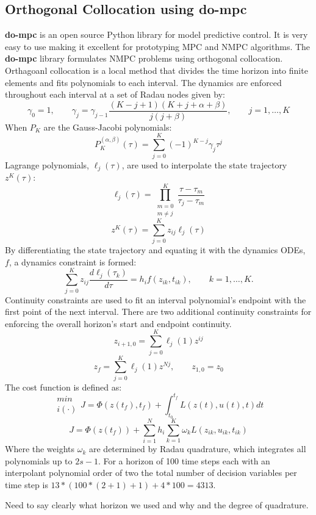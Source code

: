 \documentclass[]{article}
\begin{document}
\subsection*{Orthogonal Collocation using {do-mpc}} 
{\bf do-mpc} \citep{do-mpc}  is an open source Python library for model predictive control. It is very easy to use making it excellent for prototyping  MPC and NMPC algorithms.  
The {\bf do-mpc} library formulates NMPC problems using orthogonal collocation. Orthagoanl collocation is a local method that divides the time horizon into finite elements and fits polynomials to each interval. The dynamics are enforced throughout each interval at a set of Radau nodes given by:
        \[
        \gamma_0=1,  \qquad \gamma_j = \gamma_{j-1} \frac{(K-j+1)(K+j+\alpha+\beta)}{j(j+\beta)}, \qquad j = 1,\ldots,K
        \]
When $P_K$ are the Gauss-Jacobi polynomials:
        \[
        P_K^{(\alpha, \beta)}(\tau) = \sum_{j=0}^{K}(-1)^{K-j}\gamma_j\tau^j
        \]
Lagrange polynomials, $\ell_j(\tau)$, are used to interpolate the state trajectory $z^K(\tau)$:
        \[
	\ell_j(\tau)=\prod_{\substack{m=0 \\ m\neq j}}^{K}\frac{\tau-\tau_m}{\tau_j-\tau_m}
        \]        
        \[
	z^K(\tau)=\sum_{j=0}^{K}z_{ij}\ell_j(\tau)
        \]
By differentiating the state trajectory and equating it with the dynamics ODEs, $f$, a dynamics constraint is formed:
        \[
        \sum_{j=0}^K z_{ij}\frac{d\ell_j(\tau_k)}{d\tau}=h_if(z_{ik},t_{ik}), 
        \qquad k=1,\dots,K.
        \]
Continuity constraints are used to fit an interval polynomial's endpoint with the first point of the next interval. There are two additional continuity constraints for enforcing the overall horizon's start and endpoint continuity.
        \[
	z_{i+1,0}=\sum_{j=0}^{K}\ell_j(1)z^{ij}
        \]
        \[
	z_f=\sum_{j=0}^{K}\ell_j(1)z^{Nj}, \qquad z_{1,0} = z_0
        \]
        The cost function is defined as:
        \[
        	\substack{min \\ i(\cdot)}J=\Phi(z(t_f),t_f) + \int_{t_0}^{t_f}L(z(t),u(t),t)dt
        \]
        \[
        J=\Phi(z(t_f)) + \sum_{i=1}^{N}h_i\sum_{k=1}^{K}\omega_kL(z_{ik},u_{ik},t_{ik})
        \]
Where the weights $\omega_k$ are determined by Radau quadrature, which integrates all polynomials up to $2s-1$. For a horizon of 100 time steps each with an interpolant polynomial order of two the total number of decision variables per time step is $13*(100*(2+1)+1)+4*100=4313.$

Need to say clearly what horizon we used and why and the degree of quadrature.
\end{document}
